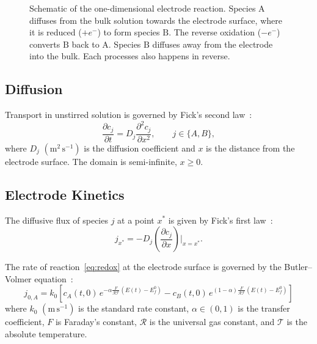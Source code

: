 \begin{figure}
  \centering
  
  \caption[One-dimensional electrode reaction]{Schematic of the
    one-dimensional electrode reaction. Species
    $\mathrm{A}$ diffuses from the bulk solution towards the electrode
    surface, where it is reduced ($+e^-$) to form species $\mathrm{B}$.
    The reverse oxidation ($-e^-$) converts $\mathrm{B}$ back to
    $\mathrm{A}$. Species $\mathrm{B}$ diffuses away from the electrode
  into the bulk. Each processes also happens in reverse.}
  \label{fig:electrode-reaction}
\end{figure}

\subsection{Diffusion}\label{sec:diffusion}

Transport in unstirred solution is governed by Fick's second
law~\cite{crank1979mathematics}:
\begin{equation}
  \frac{\partial c_j}{\partial t}
  = D_j \frac{\partial^2 c_j}{\partial x^2}, \qquad j \in \{A, B\},
  \label{eq:diffusion}
\end{equation}
where $D_j$ $(\mathrm{m^2\,s^{-1}})$ is the diffusion coefficient and
$x$ is the distance from the electrode surface. The domain is
semi-infinite, $x \geq 0$.

\subsection{Electrode Kinetics}\label{sec:electrode-kinetics}

The diffusive flux of species $j$ at a point $x^*$ is given by Fick's
first law~\cite{crank1979mathematics}:
\begin{equation}
  j_{x^*} = -D_j\left(\frac{\partial c_j}{\partial x}\right)\bigg|_{x = x^*}.
  \label{eq:ficks-first}
\end{equation}

The rate of reaction~\cref{eq:redox} at the electrode surface is governed
by the Butler--Volmer equation~\cite{dickinson2020butler}:
\begin{equation}
  j_{0, A} = k_0 \left[ c_A(t,0)\,
    e^{-\alpha \frac{F}{\mathcal{R}\mathcal{T}} (E(t) - E^0_f)}
    - c_B(t,0)\,
    e^{(1-\alpha) \frac{F}{\mathcal{R}\mathcal{T}} (E(t) - E^0_f)}
  \right]
  \label{eq:butler-volmer}
\end{equation}
where $k_0$ $(\mathrm{m\,s^{-1}})$ is the standard rate constant, $\alpha
\in (0,1)$ is the transfer coefficient, $F$ is Faraday's constant,
$\mathcal{R}$ is the universal gas constant, and $\mathcal{T}$ is the
absolute temperature.

